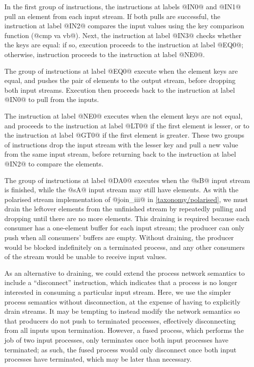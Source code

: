 In the first group of instructions, the instructions at labels @IN0@ and @IN1@ pull an element from each input stream.
If both pulls are successful, the instruction at label @IN2@ compares the input values using the key comparison function (@cmp va vb@).
Next, the instruction at label @IN3@ checks whether the keys are equal: if so, execution proceeds to the instruction at label @EQ0@; otherwise, instruction proceeds to the instruction at label @NE0@.

The group of instructions at label @EQ0@ execute when the element keys are equal, and pushes the pair of elements to the output stream, before dropping both input streams.
Execution then proceeds back to the instruction at label @IN0@ to pull from the inputs.

The instruction at label @NE0@ executes when the element keys are not equal, and proceeds to the instruction at label @LT0@ if the first element is lesser, or to the instruction at label @GT0@ if the first element is greater.
These two groups of instructions drop the input stream with the lesser key and pull a new value from the same input stream, before returning back to the instruction at label @IN2@ to compare the elements.

The group of instructions at label @DA0@ executes when the @sB@ input stream is finished, while the @sA@ input stream may still have elements.
As with the polarised stream implementation of @join_iii@ in \cref{taxonomy/polarised}, we must drain the leftover elements from the unfinished stream by repeatedly pulling and dropping until there are no more elements.
This draining is required because each consumer has a one-element buffer for each input stream; the producer can only push when all consumers' buffers are empty.
Without draining, the producer would be blocked indefinitely on a terminated process, and any other consumers of the stream would be unable to receive input values.

As an alternative to draining, we could extend the process network semantics to include a ``disconnect'' instruction, which indicates that a process is no longer interested in consuming a particular input stream.
Here, we use the simpler process semantics without disconnection, at the expense of having to explicitly drain streams.
It may be tempting to instead modify the network semantics so that producers do not push to terminated processes, effectively disconnecting from all inputs upon termination.
However, a fused process, which performs the job of two input processes, only terminates once both input processes have terminated; as such, the fused process would only disconnect once both input processes have terminated, which may be later than necessary.

